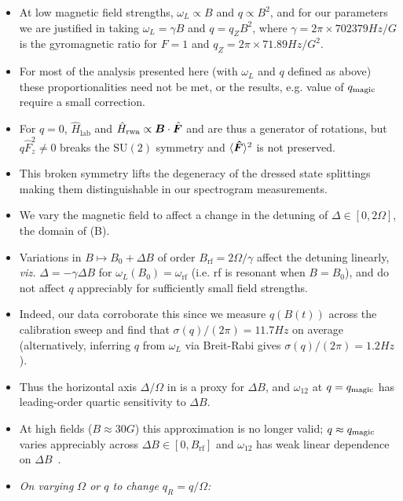 \documentclass[aps,prl,reprint,superscriptaddress,floatfix]{revtex4-1}
\begin{document}
\begin{itemize}
    \item At low magnetic field strengths, $\omega_L \propto B$ and $q \propto B^2$, and for our parameters we are justified in taking $\omega_L = \gamma B$ and $q = q_Z B^2$, where $\gamma = 2\pi \times 702379\unit{Hz/G}$ is the gyromagnetic ratio for \Rb $F=1$ and $q_Z = 2\pi \times 71.89\unit{Hz/G^2}$.
    \item For most of the analysis presented here (with $\omega_L$ and $q$ defined as above) these proportionalities need not be met, or the results, e.g. value of $q_{\text{magic}}$ require a small correction. 
    \item For $q=0$, $\hat{H}_{\text{lab}}$ and $\hat{H}_{\text{rwa}} \propto \boldsymbol{B} \cdot \hat{\boldsymbol{F}}$ and are thus a generator of rotations, but $q \hat{F}_z^2 \neq 0$ breaks the $\text{SU}(2)$ symmetry and $\langle \boldsymbol{\hat{F}} \rangle^2$ is not preserved.
    \item This broken symmetry lifts the degeneracy of the dressed state splittings making them distinguishable in our spectrogram measurements.
    \item We vary the magnetic field to affect a change in the detuning of $\Delta \in [0, 2\Omega]$, the domain of (B).
    \item Variations in $B \mapsto B_0 + \Delta B$ of order $B_{\text{rf}} = 2\Omega/\gamma$ affect the detuning linearly, \emph{viz.} $\Delta = - \gamma \Delta B$ for $\omega_L(B_0) = \omega_{\text{rf}}$ (i.e. rf is resonant when $B=B_0$), and do not affect $q$ appreciably for sufficiently small field strengths.
    \item Indeed, our data corroborate this since we measure $q(B(t))$ across the calibration sweep and find that $\sigma(q)/(2\pi) = 11.7\unit{Hz}$ on average (alternatively, inferring $q$ from $\omega_L$ via Breit-Rabi gives $\sigma(q)/(2\pi) = 1.2\unit{Hz}$).
    \item Thus the horizontal axis $\Delta/\Omega$ in  is a proxy for $\Delta B$, and $\omega_{12}$ at $q=q_{\text{magic}}$ has leading-order quartic sensitivity to $\Delta B$.
    \item At high fields ($B\approx 30\unit{G}$) this approximation is no longer valid; $q \approx q_{\text{magic}}$ varies appreciably across $\Delta B \in [0, B_{\text{rf}}]$ and $\omega_{12}$ has weak linear dependence on $\Delta B$~\cite{lundblad_pseudo_2017}.
    \item \emph{On varying $\Omega$ or $q$ to change $q_R=q/\Omega$:}

\end{itemize}
\end{document}

